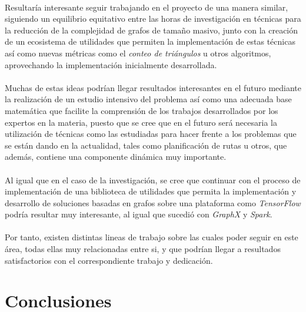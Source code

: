 \documentclass{subfiles}
\begin{document}
      \paragraph{}
      Resultaría interesante seguir trabajando en el proyecto de una manera similar, siguiendo un equilibrio equitativo entre las horas de investigación en técnicas para la reducción de la complejidad de grafos de tamaño masivo, junto con la creación de un ecosistema de utilidades que permiten la implementación de estas técnicas así como nuevas métricas como el \emph{conteo de triángulos} u otros algoritmos, aprovechando la implementación inicialmente desarrollada.

      \paragraph{}
      Muchas de estas ideas podrían llegar resultados interesantes en el futuro mediante la realización de un estudio intensivo del problema así como una adecuada base matemática que facilite la comprensión de los trabajos desarrollados por los expertos en la materia, puesto que se cree que en el futuro será necesaria la utilización de técnicas como las estudiadas para hacer frente a los problemas que se están dando en la actualidad, tales como planificación de rutas u otros, que además, contiene una componente dinámica muy importante.

      \paragraph{}
      Al igual que en el caso de la investigación, se cree que continuar con el proceso de implementación de una biblioteca de utilidades que permita la implementación y desarrollo de soluciones basadas en grafos sobre una plataforma como \emph{TensorFlow} podría resultar muy interesante, al igual que sucedió con \emph{GraphX} y \emph{Spark}.

      \paragraph{}
      Por tanto, existen distintas lineas de trabajo sobre las cuales poder seguir en este área, todas ellas muy relacionadas entre si, y que podrían llegar a resultados satisfactorios con el correspondiente trabajo y dedicación.

    \section{Conclusiones}
    \label{sec:implementation_conclusions}
\end{document}
